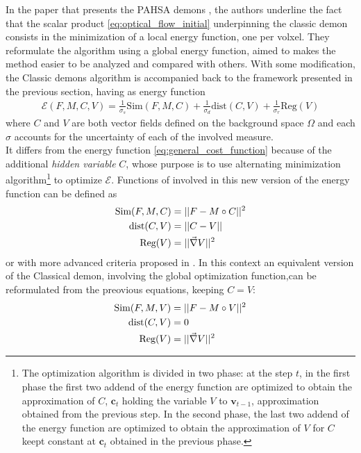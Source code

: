 In the paper that presents the PAHSA demons \cite{cachier2003iconic}, the authors underline the fact that the scalar product \ref{eq:optical_flow_initial} underpinning the classic demon consists in the minimization of a local energy function, one per volxel. They reformulate the algorithm using a global energy function, aimed to makes the method easier to be analyzed and compared with others. With some modification, the Classic demons algorithm is accompanied back to the framework presented in the previous section, having as energy function
\begin{align}
\mathcal{E}(F, M, C, V) = \frac{1}{\sigma_{s}}\text{Sim}(F,M,C) + \frac{1}{\sigma_{d}}\text{dist}(C,V) +  \frac{1}{\sigma_{r}}\text{Reg}(V) 
\end{align}
where $C$ and $V$ are both vector fields defined on the background space $\Omega$ and each $\sigma$ accounts for the uncertainty of each of the involved measure.\\
It differs from the energy function \ref{eq:general_cost_function} because of the additional \emph{hidden variable} $C$, whose purpose is to use alternating minimization algorithm\footnote{
	The optimization algorithm is divided in two phase: at the step $t$, in the first phase the first two addend of the energy function are optimized to obtain the approximation of $C$, $\mathbf{c}_{t}$ holding the variable $V$ to $\mathbf{v}_{t-1}$, approximation obtained from the previous step. In the second phase, the last two addend of the energy function are optimized to obtain the approximation of $V$ for $C$ keept constant at $\mathbf{c}_{t}$ obtained in the previous phase.
	} 
to optimize $\mathcal{E}$. Functions of involved in this new version of the energy function can be defined as
\begin{align*}
\text{Sim}(F,M,C) &= \vert\lvert  F - M\circ C   \rvert\vert^{2}\\
\text{dist}(C,V) &=\vert\lvert C - V \rvert\vert  \\
\text{Reg}(V)  &=\vert\lvert \vec \nabla V   \rvert\vert^{2}
\end{align*}
or with more advanced criteria proposed in \cite{cachier2003iconic}. In this context an equivalent version of the Classical demon, involving the global optimization function,can be reformulated from the preovious equations, keeping $C=V$:
\begin{align*}
\text{Sim}(F,M,V) &= \vert\lvert  F - M\circ V   \rvert\vert^{2}\\
\text{dist}(C,V) &=0 \\
\text{Reg}(V)  &=\vert\lvert \vec \nabla V   \rvert\vert^{2}
\end{align*}
